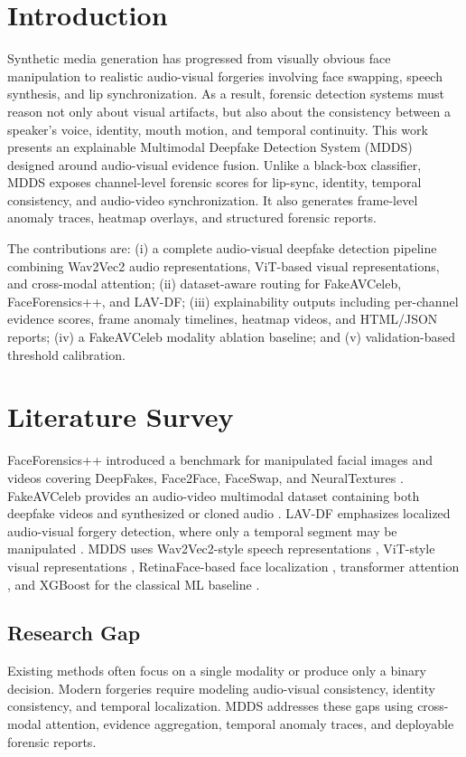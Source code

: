 \documentclass[conference]{IEEEtran}
\begin{document}
\section{Introduction}
Synthetic media generation has progressed from visually obvious face manipulation to realistic audio-visual forgeries involving face swapping, speech synthesis, and lip synchronization. As a result, forensic detection systems must reason not only about visual artifacts, but also about the consistency between a speaker's voice, identity, mouth motion, and temporal continuity. This work presents an explainable Multimodal Deepfake Detection System (MDDS) designed around audio-visual evidence fusion. Unlike a black-box classifier, MDDS exposes channel-level forensic scores for lip-sync, identity, temporal consistency, and audio-video synchronization. It also generates frame-level anomaly traces, heatmap overlays, and structured forensic reports.

The contributions are: (i) a complete audio-visual deepfake detection pipeline combining Wav2Vec2 audio representations, ViT-based visual representations, and cross-modal attention; (ii) dataset-aware routing for FakeAVCeleb, FaceForensics++, and LAV-DF; (iii) explainability outputs including per-channel evidence scores, frame anomaly timelines, heatmap videos, and HTML/JSON reports; (iv) a FakeAVCeleb modality ablation baseline; and (v) validation-based threshold calibration.

\section{Literature Survey}
FaceForensics++ introduced a benchmark for manipulated facial images and videos covering DeepFakes, Face2Face, FaceSwap, and NeuralTextures \cite{rossler2019faceforensics}. FakeAVCeleb provides an audio-video multimodal dataset containing both deepfake videos and synthesized or cloned audio \cite{khalid2021fakeavceleb}. LAV-DF emphasizes localized audio-visual forgery detection, where only a temporal segment may be manipulated \cite{cai2022lavdf}. MDDS uses Wav2Vec2-style speech representations \cite{baevski2020wav2vec}, ViT-style visual representations \cite{dosovitskiy2021vit}, RetinaFace-based face localization \cite{deng2020retinaface}, transformer attention \cite{vaswani2017attention}, and XGBoost for the classical ML baseline \cite{chen2016xgboost}.

\subsection{Research Gap}
Existing methods often focus on a single modality or produce only a binary decision. Modern forgeries require modeling audio-visual consistency, identity consistency, and temporal localization. MDDS addresses these gaps using cross-modal attention, evidence aggregation, temporal anomaly traces, and deployable forensic reports.
\end{document}
